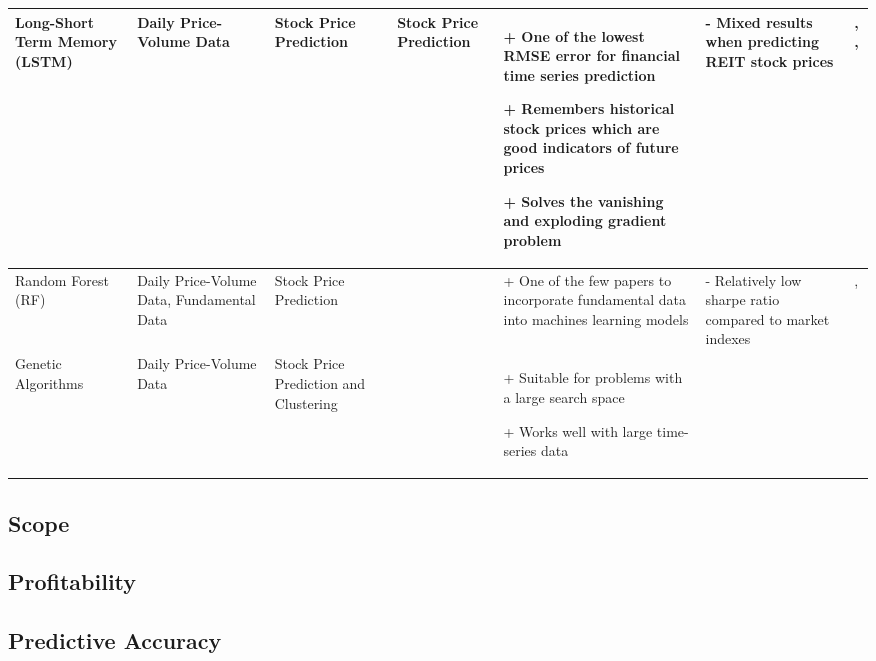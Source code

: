 \documentclass[a4paper,12pt]{report}
\renewcommand\thechapter{\Roman{chapter}}
\newcommand{\placetextbox}[3]{%
  \setbox0=\hbox{#3}%
  \AddToShipoutPictureFG*{%
    \put(\LenToUnit{#1\paperwidth},\LenToUnit{#2\paperheight}){\vtop{{\null}\makebox[0pt][c]{#3}}}%
  }%
}%
\numberwithin{equation}{section}
\theoremstyle{definition}
\begin{document}
\begin{landscape}
\begin{table}[H]
\begin{adjustwidth}{-1.9cm}{-1.9cm}
\begin{tabular}{|p{2.6cm}|p{2.7cm}|p{2.7cm}|p{3.5cm}|p{5cm}|p{5cm}|p{4cm}|}
    \\ \hline Long-Short Term Memory (LSTM) & Daily Price-Volume Data & Stock Price Prediction & Stock Price Prediction & + One of the lowest RMSE error for financial time series prediction \par+ Remembers historical stock prices which are good indicators of future prices \par+ Solves the vanishing and exploding gradient problem & - Mixed results when predicting REIT stock prices & \cite{axelsson_univariate_2023},   \cite{habbab_machine_2022}, \cite{obthong_survey_2020} 
    \\ \hline Random Forest (RF) & Daily Price-Volume Data, Fundamental Data & Stock Price Prediction & & + One of the few papers to incorporate fundamental data into machines learning models & - Relatively low sharpe ratio compared to market indexes & \cite{cao_fundamental_2021},   \cite{huang_machine_2021}  
    \\ \hline Genetic Algorithms & Daily Price-Volume Data & Stock Price Prediction and Clustering & & + Suitable for problems with a large search space \par+ Works well with large time-series data & \cite{obthong_survey_2020}
    \\ \hline
    \end{tabular}
  \end{adjustwidth}
    \end{table}
  




\end{landscape}



\subsection{Scope}
\subsection{Profitability}
\subsection{Predictive Accuracy}

\titleformat{\chapter}[block]
  {\normalfont\huge\bfseries}{\thechapter.}{1em}{\Huge\centering}
\titlespacing*{\chapter}{0pt}{150pt}{0pt}
\setcounter{chapter}{1}
\renewcommand{\thechapter}{\Roman{chapter}}
\end{document}
